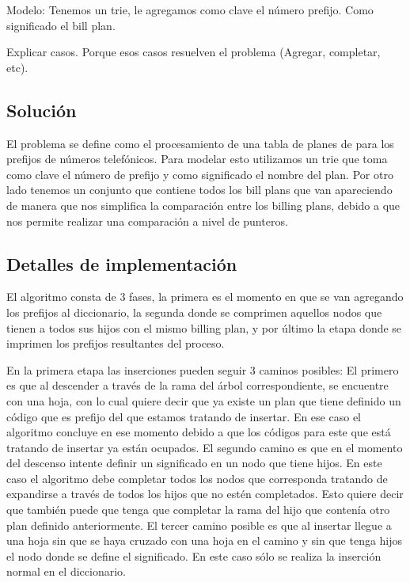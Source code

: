 Modelo: Tenemos un trie, le agregamos como clave el número prefijo. Como significado
el bill plan.

Explicar casos. Porque esos casos resuelven el problema (Agregar, completar, etc).

\subsection*{Solución}

El problema se define como el procesamiento de una tabla de planes de para los
prefijos de números telefónicos. Para modelar esto utilizamos un trie que toma como clave 
el número de prefijo y como significado el nombre del plan. 
Por otro lado tenemos un conjunto que contiene todos los bill plans que van apareciendo
de manera que nos simplifica la comparación entre los billing plans, debido a que 
nos permite realizar una comparación a nivel de punteros.

\subsection*{Detalles de implementación}

El algoritmo consta de 3 fases, la primera es el momento en que se van agregando los prefijos
al diccionario, la segunda donde se comprimen aquellos nodos que tienen a todos sus hijos
con el mismo billing plan, y por último la etapa donde se imprimen los prefijos resultantes 
del proceso.

En la primera etapa las inserciones pueden seguir 3 caminos posibles:
El primero es que al descender a través de la rama del árbol correspondiente, 
se encuentre con una hoja, con lo cual quiere decir que ya existe un plan que tiene definido
un código que es prefijo del que estamos tratando de insertar. En ese caso el algoritmo 
concluye en ese momento debido a que los códigos para este que está tratando de insertar ya están
ocupados.
El segundo camino es que en el momento del descenso intente definir un significado en un nodo que tiene
hijos. En este caso el algoritmo debe completar todos los nodos que corresponda tratando de expandirse
a través de todos los hijos que no estén completados. Esto quiere decir que también puede que tenga que completar 
la rama del hijo que contenía otro plan definido anteriormente.
El tercer camino posible es que al insertar llegue a una hoja sin que se haya cruzado con una hoja en el camino
y sin que tenga hijos el nodo donde se define el significado. En este caso sólo se realiza la inserción 
normal en el diccionario.

